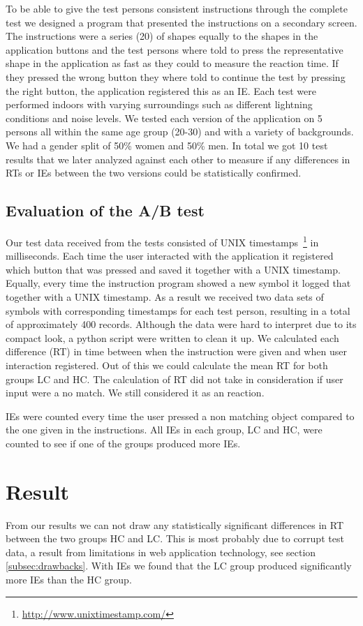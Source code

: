\documentclass[runningheads,a4paper]{llncs}
\begin{document}
To be able to give the test persons consistent instructions through the complete test we designed a program that presented the instructions on a secondary screen. The instructions were a series (20) of shapes equally to the shapes in the application buttons and the test persons where told to press the representative shape in the application as fast as they could to measure the reaction time. If they pressed the wrong button they where told to continue the test by pressing the right button, the application registered this as an IE. Each test were performed indoors with varying surroundings such as different lightning conditions and noise levels. We tested each version of the application on 5 persons all within the same age group (20-30) and with a variety of backgrounds. We had a gender split of 50\% women and 50\% men. In total we got 10 test results that we later analyzed against each other to measure if any differences in RTs or IEs between the two versions could be statistically confirmed.

\subsection{Evaluation of the A/B test}
Our test data received from the tests consisted of UNIX timestamps~\footnote{\url{http://www.unixtimestamp.com/}} in milliseconds. Each time the user interacted with the application it registered which button that was pressed and saved it together with a UNIX timestamp. Equally, every time the instruction program showed a new symbol it logged that together with a UNIX timestamp. As a result we received two data sets of symbols with corresponding timestamps for each test person, resulting in a total of approximately 400 records. Although the data were hard to interpret due to its compact look, a python script were written to clean it up. We calculated each difference (RT) in time between when the instruction were given and when user interaction registered. Out of this we could calculate the mean RT for both groups LC and HC. The calculation of RT did not take in consideration if user input were a no match. We still considered it as an reaction.

IEs were counted every time the user pressed a non matching object compared to the one given in the instructions. All IEs in each group, LC and HC, were counted to see if one of the groups produced more IEs.

\section{Result}
From our results we can not draw any statistically significant differences in RT between the two groups HC and LC. This is most probably due to corrupt test data, a result from limitations in web application technology, see section \ref{subsec:drawbacks}. With IEs we found that the LC group produced significantly more IEs than the HC group.
\end{document}
